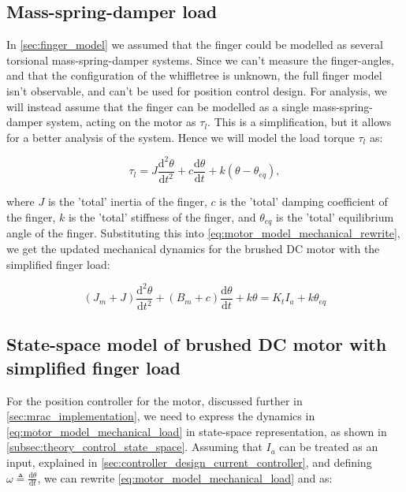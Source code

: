 \subsection{Mass-spring-damper load}%
\label{subsec:mass_spring_model}

In \cref{sec:finger_model} we assumed that the finger could be modelled as several torsional mass-spring-damper systems. Since we can't measure the finger-angles, and that the configuration of the whiffletree is unknown, the full finger model isn't observable, and can't be used for position control design. For analysis, we will instead assume that the finger can be modelled as a single mass-spring-damper system, acting on the motor as $\tau_l$. This is a simplification, but it allows for a better analysis of the system. Hence we will model the load torque $\tau_l$ as:

\begin{equation}
    \tau_l = J \frac{\mathrm{d}^2\theta}{\mathrm{d}t^2} + c \frac{\mathrm{d}\theta}{\mathrm{d}t} + k (\theta - \theta_{eq}),
\end{equation}

where $J$ is the 'total' inertia of the finger, $c$ is the 'total' damping coefficient of the finger, $k$ is the 'total' stiffness of the finger, and $\theta_{eq}$ is the 'total' equilibrium angle of the finger. Substituting this into \cref{eq:motor_model_mechanical_rewrite}, we get the updated mechanical dynamics for the brushed DC motor with the simplified finger load:

\begin{equation}
    \label{eq:motor_model_mechanical_load}
    (J_m + J) \frac{\mathrm{d}^2\theta}{\mathrm{d}t^2} + (B_m + c) \frac{\mathrm{d}\theta}{\mathrm{d}t} + k \theta = K_t I_a + k \theta_{eq}
\end{equation}

\subsection{State-space model of brushed DC motor with simplified finger load}%
\label{subsec:state_space_model_load}

For the position controller for the motor, discussed further in \cref{sec:mrac_implementation}, we need to express the dynamics in \cref{eq:motor_model_mechanical_load} in state-space representation, as shown in \cref{subsec:theory_control_state_space}. Assuming that $I_a$ can be treated as an input, explained in \cref{sec:controller_design_current_controller}, and defining $\omega\triangleq\frac{\mathrm{d}\theta}{\mathrm{d}t}$, we can rewrite \cref{eq:motor_model_mechanical_load} and as:

